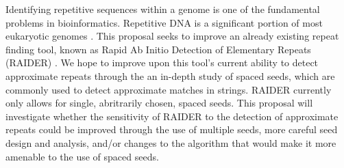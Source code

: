 \documentclass{article}
\begin{document}
\newcommand\COURSE{Charlotte Schaeffer}
\newcommand\HWNUM{Research Overview}             

\s
Identifying repetitive sequences within a genome is one of the fundamental problems in bioinformatics. Repetitive DNA is a significant portion of most eukaryotic genomes \cite{pevzner2004de-novo}. This proposal seeks to improve an already existing repeat finding tool, known as Rapid Ab Initio Detection of Elementary Repeats (RAIDER) \cite{figueroa2013raiderpaper}. We hope to improve upon this tool's current ability to detect approximate repeats through the an in-depth study of spaced seeds, which are commonly used to detect approximate matches in strings. RAIDER currently only allows for single, abritrarily chosen, spaced seeds. This proposal will investigate whether the sensitivity of RAIDER to the detection of approximate repeats could be improved through the use of multiple seeds, more careful seed design and analysis, and/or changes to the algorithm that would make it more amenable to the use of spaced seeds.


\end{document}
